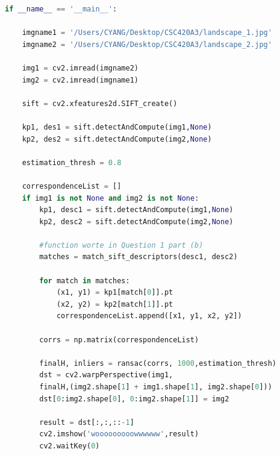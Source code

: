 \documentclass{exam}
\begin{document}
\begin{questions}
\begin{lstlisting}[language=python, frame=single]
if __name__ == '__main__':

    imgname1 = '/Users/CYANG/Desktop/CSC420A3/landscape_1.jpg'
    imgname2 = '/Users/CYANG/Desktop/CSC420A3/landscape_2.jpg'

    img1 = cv2.imread(imgname2)
    img2 = cv2.imread(imgname1)

    sift = cv2.xfeatures2d.SIFT_create()

    kp1, des1 = sift.detectAndCompute(img1,None)
    kp2, des2 = sift.detectAndCompute(img2,None)

    estimation_thresh = 0.8

    correspondenceList = []
    if img1 is not None and img2 is not None:
        kp1, desc1 = sift.detectAndCompute(img1,None)
        kp2, desc2 = sift.detectAndCompute(img2,None)
    
        #function worte in Question 1 part (b)
        matches = match_sift_descriptors(desc1, desc2)

        for match in matches:
            (x1, y1) = kp1[match[0]].pt
            (x2, y2) = kp2[match[1]].pt
            correspondenceList.append([x1, y1, x2, y2])

        corrs = np.matrix(correspondenceList)

        finalH, inliers = ransac(corrs, 1000,estimation_thresh)
        dst = cv2.warpPerspective(img1,
        finalH,(img2.shape[1] + img1.shape[1], img2.shape[0]))
        dst[0:img2.shape[0], 0:img2.shape[1]] = img2

        result = dst[:,:,::-1]
        cv2.imshow('wooooooooowwwwww',result)
        cv2.waitKey(0)


\end{lstlisting}


\end{questions}
\end{document}
